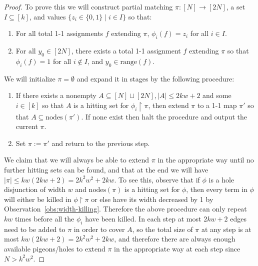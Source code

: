 \documentclass[11pt]{article}
\newcommand{\B}{\{0,1\}}
\newcommand{\nodes}{\mathrm{nodes}}
\begin{document}
\begin{proof}
To prove this we will construct partial matching $\pi: [N] \to [2N]$, a set $I \subseteq [k]$, and values $\{z_i \in \B \mid i \in I\}$ so that:
\begin{enumerate}
    \item For all total 1-1 assignments $f$ extending $\pi$, $\phi_i(f) = z_i$ for all $i \in I$.
    \item For all $y_0 \in [2N]$, there exists a total 1-1 assignment $f$ extending $\pi$ so that $\phi_i(f)=1$ for all $i \notin I$, and $y_0 \in \mathrm{range}(f)$.
\end{enumerate}
We will initialize $\pi = \emptyset$ and expand it in stages by the following procedure:
\begin{enumerate}
    \item If there exists a nonempty $A \subseteq [N] \sqcup [2N], |A| \leq 2kw + 2$ and some $i\in [k]$ so that $A$ is a hitting set for $\phi_i \upharpoonright \pi$, then extend $\pi$ to a 1-1 map $\pi'$ so that $A \subseteq \nodes(\pi')$. If none exist then halt the procedure and output the current $\pi$.
    \item Set $\pi := \pi'$ and return to the previous step.
\end{enumerate}
We claim that we will always be able to extend $\pi$ in the appropriate way until no further hitting sets can be found, and that at the end we will have $|\pi| \leq kw(2kw+2)=2k^2w^2 +2kw$. To see this, observe that if $\phi$ is a hole disjunction of width $w$ and $\nodes(\pi)$ is a hitting set for $\phi$, then every term in $\phi$ will either be killed in $\phi\upharpoonright\pi$ or else have its width decreased by 1 by Observation~\ref{obs:width-killing}. Therefore the above procedure can only repeat $kw$ times before all the $\phi_i$ have been killed. In each step at most $2kw+2$ edges need to be added to $\pi$ in order to cover $A$, so the total size of $\pi$ at any step is at most $kw(2kw+2)=2k^2w^2 +2kw$, and therefore there are always enough available pigeons/holes to extend $\pi$ in the appropriate way at each step since $N > k^2w^2$.


\end{proof}
\end{document}

